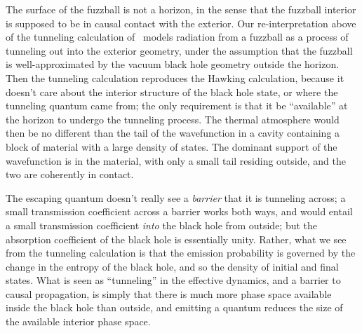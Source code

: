 \documentclass[11pt]{article}
\newcommand{\rcite}{\cite}
\numberwithin{equation}{section}
\begin{document}
The surface of the fuzzball is not a horizon, in the sense that the fuzzball interior is supposed to be in causal contact with the exterior.  Our re-interpretation above of the tunneling calculation of~\rcite{Kraus:1994by,Kraus:1994fj,Parikh:1999mf} models radiation from a fuzzball as a process of tunneling out into the exterior geometry,
under the assumption that the fuzzball is well-approximated by the vacuum black hole geometry outside the horizon.  Then the tunneling calculation reproduces the Hawking calculation, because it doesn't care about the interior structure of the black hole state, or where the tunneling quantum came from; the only requirement is that it be ``available'' at the horizon to undergo the tunneling process.
%
The thermal atmosphere would then be no different than the tail of the wavefunction in a cavity containing a block of material with a large density of states.  The dominant support of the wavefunction is in the material, with only a small tail residing outside, and the two are coherently in contact.

The escaping quantum doesn't really see a {\it barrier} that it is tunneling across; a small transmission coefficient across a barrier works both ways, and would entail a small transmission coefficient {\it into} the black hole from outside; but the absorption coefficient of the black hole is essentially unity.  Rather, what we see from the tunneling calculation is that the emission probability is governed by the change in the entropy of the black hole, and so the density of initial and final states.  What is seen as ``tunneling'' in the effective dynamics, and a barrier to causal propagation, is simply that there is much more phase space available inside the black hole than outside, and emitting a quantum reduces the size of the available interior phase space.
\end{document}

